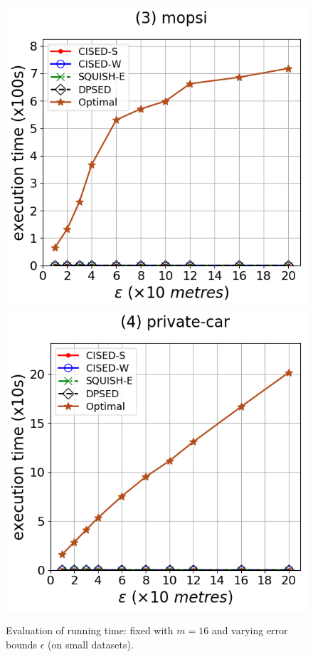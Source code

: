 {\begin{figure}[tb!]
\includegraphics[scale = 0.290]{Figures/Exp-opt-time-epsilon-mopsi.png}\hspace{1ex}
\includegraphics[scale = 0.290]{Figures/Exp-opt-time-epsilon-private.png}
\caption{\small Evaluation of running time: fixed with $m=16$ and varying error bounds $\epsilon$ (on small datasets).}
\label{fig:time-optimal-epsilon}
\vspace{-2ex}
\end{figure}




}
